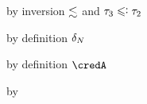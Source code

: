 {\begin{lamportproof*}
    \begin{pfproof}
        \begin{pfproof}
          by inversion $\lesssim$ and $\stype_3 \subteq \stype_2$
        \end{pfproof}
        \begin{pfproof}
          by definition $\delta_{N}$
        \end{pfproof}
        \begin{pfproof}
          by definition $\credA$
        \end{pfproof}
      \qedstep
        \begin{pfproof}
          by 
        \end{pfproof}
    \end{pfproof}


\end{lamportproof*}}
